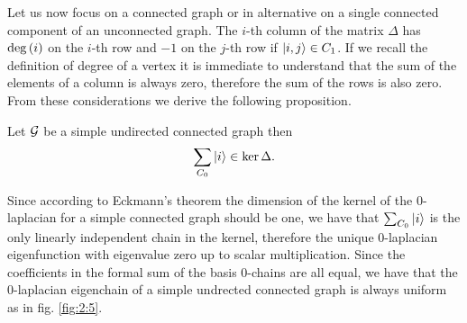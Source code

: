 \documentclass[../2.tex]{subfiles}
\begin{document}
Let us now focus on a connected graph or in alternative on a single connected component of an unconnected graph. 
The $i$-th column of the matrix $\Delta$ has $\operatorname{deg}{(i)}$ on the $i$-th row and $-1$ on the $j$-th row if $| i,j \rangle \in C_1$. If we recall the definition of degree of a vertex
it is immediate to understand that the sum of the elements of a column is always zero, therefore the sum of the rows is also zero. From these considerations
we derive the following proposition.

\begin{prop}
    Let $\mathcal{G}$ be a simple undirected connected graph then 
    \[ \sum_{C_0} | i \rangle \in \ker\Delta. \]
\end{prop}

Since according to Eckmann's theorem the dimension of the kernel of the $0$-laplacian for a simple connected graph should be one, 
we have that $\sum_{C_0} | i \rangle$ is the only linearly independent chain in the kernel, therefore the unique $0$-laplacian eigenfunction
with eigenvalue zero up to scalar multiplication. Since the coefficients in the formal sum of the basis $0$-chains are all equal, we have that the $0$-laplacian eigenchain
of a simple undrected connected graph is always uniform as in fig. \ref{fig:2:5}.\\
\hfill \\
\end{document}
